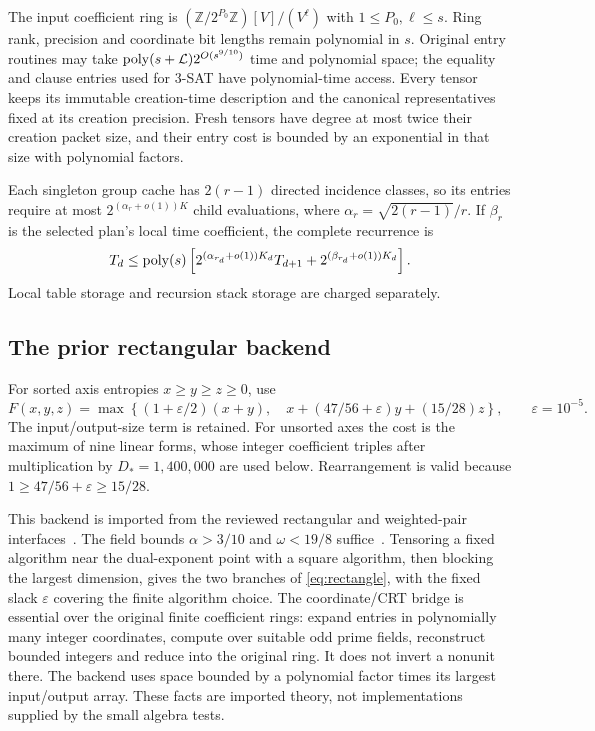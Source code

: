 The input coefficient ring is
$(\mathbb Z/2^{P_0}\mathbb Z)[V]/(V^\ell)$ with
$1\le P_0,\ell\le s$. Ring rank, precision and coordinate bit lengths
remain polynomial in $s$.
Original entry routines may take
$\operatorname{poly}(s+\mathcal L)2^{O(s^{9/10})}$ time and polynomial space;
the equality and clause entries used for 3-SAT have polynomial-time access.
Every tensor keeps its immutable creation-time description and the
canonical representatives fixed at its creation precision. Fresh tensors
have degree at most twice their creation packet size, and their entry
cost is bounded by an exponential in that size with polynomial factors.

Each singleton group cache has $2(r-1)$ directed incidence classes,
so its entries require at most $2^{(\alpha_r+o(1))K}$ child evaluations,
where $\alpha_r=\sqrt{2(r-1)}/r$. If $\beta_r$ is the selected plan's
local time coefficient, the complete recurrence is
\begin{equation}\label{eq:paid-recurrence}
 T_d\le\operatorname{poly}(s)\left[
  2^{(\alpha_{r_d}+o(1))K_d}T_{d+1}
  +2^{(\beta_{r_d}+o(1))K_d}\right].
\end{equation}
Local table storage and recursion stack storage are charged separately.

\subsection{The prior rectangular backend}

For sorted axis entropies $x\ge y\ge z\ge0$, use
\begin{equation}\label{eq:rectangle}
 F(x,y,z)=\max\left\{(1+\varepsilon/2)(x+y),\quad
 x+(47/56+\varepsilon)y+(15/28)z\right\},
 \qquad\varepsilon=10^{-5}.
\end{equation}
The input/output-size term is retained. For unsorted axes the cost is
the maximum of nine linear forms, whose integer coefficient triples after
multiplication by $D_*=1{,}400{,}000$ are used below. Rearrangement is valid
because $1\ge47/56+\varepsilon\ge15/28$.

This backend is imported from the reviewed rectangular and weighted-pair
interfaces~\cite{pairwise}. The field bounds
$\alpha>3/10$ and $\omega<19/8$ suffice~\cite{matrix}.
Tensoring a fixed algorithm near the dual-exponent point with a square
algorithm, then blocking the largest dimension, gives the two branches
of \eqref{eq:rectangle}, with the fixed slack $\varepsilon$ covering
the finite algorithm choice. The coordinate/CRT bridge is essential over
the original finite coefficient rings: expand entries in polynomially
many integer coordinates, compute over suitable odd prime fields,
reconstruct bounded integers and reduce into the original ring.
It does not invert a nonunit there. The backend uses space bounded by a
polynomial factor times its largest input/output array. These facts are
imported theory, not implementations supplied by the small algebra tests.

